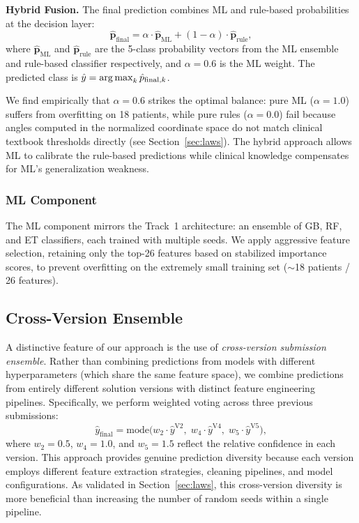 \noindent\textbf{Hybrid Fusion.}
The final prediction combines ML and rule-based probabilities at the decision layer:
\begin{equation}
    \hat{\mathbf{p}}_{\text{final}} = \alpha \cdot \hat{\mathbf{p}}_{\text{ML}} + (1 - \alpha) \cdot \hat{\mathbf{p}}_{\text{rule}},
    \label{eq:hybrid}
\end{equation}
where $\hat{\mathbf{p}}_{\text{ML}}$ and $\hat{\mathbf{p}}_{\text{rule}}$ are the 5-class probability vectors from the ML ensemble and rule-based classifier respectively, and $\alpha = 0.6$ is the ML weight. The predicted class is $\hat{y} = \operatorname*{arg\,max}_k \hat{p}_{\text{final},k}$.

We find empirically that $\alpha = 0.6$ strikes the optimal balance: pure ML ($\alpha = 1.0$) suffers from overfitting on 18 patients, while pure rules ($\alpha = 0.0$) fail because angles computed in the normalized coordinate space do not match clinical textbook thresholds directly (see Section~\ref{sec:laws}). The hybrid approach allows ML to calibrate the rule-based predictions while clinical knowledge compensates for ML's generalization weakness.

\subsubsection{ML Component}
The ML component mirrors the Track~1 architecture: an ensemble of GB, RF, and ET classifiers, each trained with multiple seeds. We apply aggressive feature selection, retaining only the top-26 features based on stabilized importance scores, to prevent overfitting on the extremely small training set ($\sim$18 patients / 26 features).

\subsection{Cross-Version Ensemble}
\label{sec:ensemble}

A distinctive feature of our approach is the use of \textit{cross-version submission ensemble}. Rather than combining predictions from models with different hyperparameters (which share the same feature space), we combine predictions from entirely different solution versions with distinct feature engineering pipelines. Specifically, we perform weighted voting across three previous submissions:
\begin{equation}
    \hat{y}_{\text{final}} = \text{mode}\bigl(w_2 \cdot \hat{y}^{\text{V2}},\; w_4 \cdot \hat{y}^{\text{V4}},\; w_5 \cdot \hat{y}^{\text{V5}}\bigr),
\end{equation}
where $w_2 = 0.5$, $w_4 = 1.0$, and $w_5 = 1.5$ reflect the relative confidence in each version. This approach provides genuine prediction diversity because each version employs different feature extraction strategies, cleaning pipelines, and model configurations. As validated in Section~\ref{sec:laws}, this cross-version diversity is more beneficial than increasing the number of random seeds within a single pipeline.
